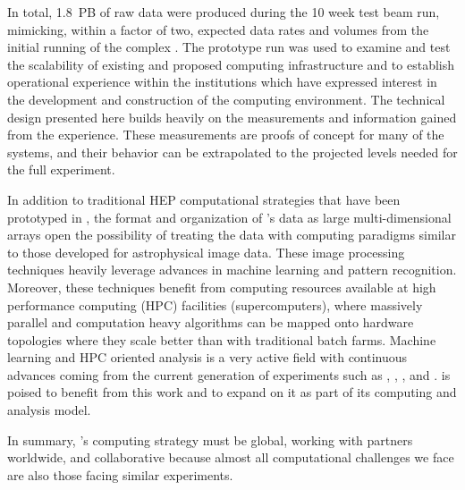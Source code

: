 In total, \SI{1.8}{PB} of raw data were produced during the 10 week test beam run, mimicking, within a factor of two, expected data rates and volumes from the initial running of the  complex .  The prototype run was used to examine and test the scalability of existing and proposed computing infrastructure and to establish operational experience within the institutions which have expressed interest in the development and construction of the  computing environment.  The technical design presented here builds heavily on the measurements and information gained from the  experience.   These measurements are proofs of concept for many of the systems, and their behavior can be extrapolated to the projected levels needed for the full  experiment. 

In addition to traditional HEP computational strategies that have been prototyped in , the format and organization of 's data as large multi-dimensional arrays open the possibility of treating the data with computing paradigms similar to those developed for astrophysical image data.  These image processing techniques heavily leverage advances in machine learning and pattern recognition.  Moreover, these techniques benefit from computing resources available at high performance computing (HPC) facilities (supercomputers), where massively parallel and computation heavy algorithms can be mapped onto hardware topologies where they scale better than with traditional batch farms.  Machine learning and HPC oriented analysis is a very active field with continuous advances coming from the current generation of  experiments such as , , , and .   is poised to benefit from this work and to expand on it as part of its computing and analysis model.

In summary, 's computing strategy must be global, working with partners worldwide, and collaborative because almost all computational challenges we face are also those facing similar experiments. 
 
